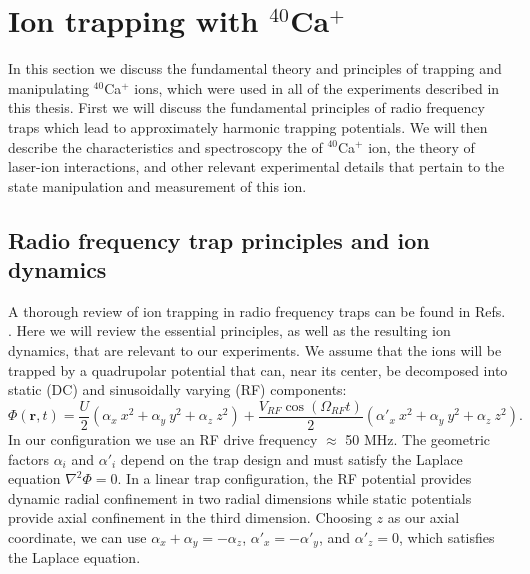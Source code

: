 \chapter{Ion trapping with {$^{40}$Ca$^+$}}

In this section we discuss the fundamental theory and principles of trapping and manipulating $^{40}$Ca$^+$ ions, which were used in all of the experiments described in this thesis. First we will discuss the fundamental principles of radio frequency traps which lead to approximately harmonic trapping potentials. We will then describe the characteristics and spectroscopy the of $^{40}$Ca$^+$ ion, the theory of laser-ion interactions, and other relevant experimental details that pertain to the state manipulation and measurement of this ion. 



\section{Radio frequency trap principles and ion dynamics}

A thorough review of ion trapping in radio frequency traps can be found in Refs. \cite{Wineland98.NIST.103.259, Leibfried03.RMP.75.281, Häffner2008155, Roos00.Thesis}. Here we will review the essential principles, as well as the resulting ion dynamics, that are relevant to our experiments. We assume that the ions will be trapped by a quadrupolar potential that can, near its center, be decomposed into static (DC) and sinusoidally varying (RF) components:
\begin{equation} 
\Phi (\textbf{r}, t) = \frac{U}{2} ( \alpha_x \ x^2 + \alpha_y \ y^2 + \alpha_z \ z^2 ) + \frac{V_{RF} \cos{(\Omega_{RF} t)}}{2} ( \alpha'_x \ x^2 + \alpha_y \ y^2 + \alpha_z \ z^2 ) \text{.}
\end{equation}
In our configuration we use an RF drive frequency $\approx$ 50 MHz. The geometric factors $\alpha_i$ and $\alpha'_i$ depend on the trap design and must satisfy the Laplace equation $\nabla^2 \Phi = 0$. In a linear trap configuration, the RF potential provides dynamic radial confinement in two radial dimensions while static potentials provide axial confinement in the third dimension. Choosing $z$ as our axial coordinate, we can use $\alpha_x + \alpha_y = - \alpha_z$, $\alpha'_x = - \alpha'_y$, and $\alpha'_z = 0$, which satisfies the Laplace equation. 

